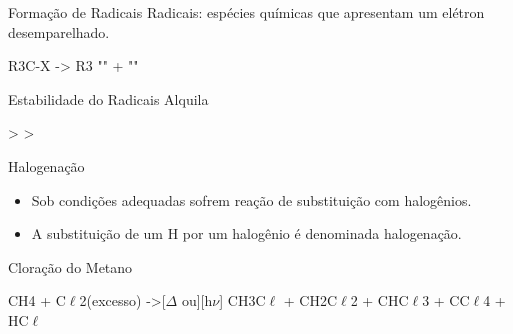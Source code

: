 \documentclass[presentation,professionalfonts,aspectratio=169]{beamer}
\begin{document}
\begin{frame}[label={sec:org76c43df}]{Formação de Radicais}
\alert{Radicais:} espécies químicas que apresentam um elétron desemparelhado.

\begin{reaction}
	R3C-X -> R3 ""  +  ""
\end{reaction}


\begin{bclogo}[couleur=blue!30 , arrondi=0.1 , logo=\bcplume , epBarre=3.5]{Estabilidade do Radicais Alquila}
\begin{center}	
 \qquad > \qquad {} \qquad > \qquad {}
\end{center}
\end{bclogo}
\end{frame}

\begin{frame}[label={sec:orgc1e6b56}]{Halogenação}
\begin{itemize}
\item Sob condições adequadas sofrem reação de substituição com halogênios.
\item A substituição de um \alert{H} por um halogênio é denominada \alert{halogenação}.
\end{itemize}



\begin{bclogo}[couleur=blue!30 , arrondi=0.1 , logo=\bcplume , epBarre=3.5]{Cloração do Metano}
\begin{reaction*}
CH4 + C$\ell$2(excesso) ->[$\Delta$ ou][h$\nu$] CH3C$\ell$ + CH2C$\ell$2 + CHC$\ell$3 + CC$\ell$4 + HC$\ell$
\end{reaction*}	 
\end{bclogo}
\end{frame}
\end{document}
